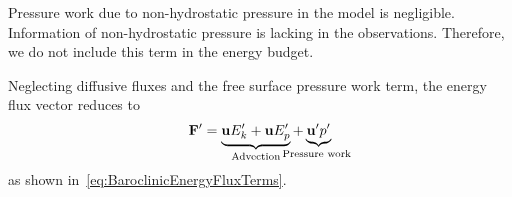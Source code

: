 \documentclass{ametsocV6.1}
\begin{document}
Pressure work due to non-hydrostatic pressure in the model is negligible.
Information of non-hydrostatic pressure is lacking in the observations.
Therefore, we do not include this term in the energy budget.

Neglecting diffusive fluxes and the free surface pressure work term, the energy flux vector reduces to
\begin{equation}
\mathbf{F'} = \underbrace{\mathbf{u}E'_k + \mathbf{u}E'_p}_\text{Advection} + \underbrace{\mathbf{u^\prime}p^\prime}_{\text{\makebox[0pt]{Pressure work} }}
\label{eq:BaroclinicEnergyFluxTermsAppendix}
\end{equation}
as shown in~\eqref{eq:BaroclinicEnergyFluxTerms}.




\end{document}
